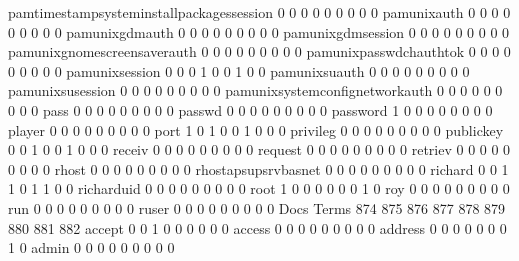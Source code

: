 \documentclass[compress,8pt]{beamer}
\begin{document}
\begin{frame}
\begin{Schunk}
  pamtimestampsysteminstallpackagessession   0   0   0   0   0   0   0   0   0
  pamunixauth                                0   0   0   0   0   0   0   0   0
  pamunixgdmauth                             0   0   0   0   0   0   0   0   0
  pamunixgdmsession                          0   0   0   0   0   0   0   0   0
  pamunixgnomescreensaverauth                0   0   0   0   0   0   0   0   0
  pamunixpasswdchauthtok                     0   0   0   0   0   0   0   0   0
  pamunixsession                             0   0   0   1   0   0   1   0   0
  pamunixsuauth                              0   0   0   0   0   0   0   0   0
  pamunixsusession                           0   0   0   0   0   0   0   0   0
  pamunixsystemconfignetworkauth             0   0   0   0   0   0   0   0   0
  pass                                       0   0   0   0   0   0   0   0   0
  passwd                                     0   0   0   0   0   0   0   0   0
  password                                   1   0   0   0   0   0   0   0   0
  player                                     0   0   0   0   0   0   0   0   0
  port                                       1   0   1   0   0   1   0   0   0
  privileg                                   0   0   0   0   0   0   0   0   0
  publickey                                  0   0   1   0   0   1   0   0   0
  receiv                                     0   0   0   0   0   0   0   0   0
  request                                    0   0   0   0   0   0   0   0   0
  retriev                                    0   0   0   0   0   0   0   0   0
  rhost                                      0   0   0   0   0   0   0   0   0
  rhostapsupsrvbasnet                        0   0   0   0   0   0   0   0   0
  richard                                    0   0   1   1   0   1   1   0   0
  richarduid                                 0   0   0   0   0   0   0   0   0
  root                                       1   0   0   0   0   0   0   1   0
  roy                                        0   0   0   0   0   0   0   0   0
  run                                        0   0   0   0   0   0   0   0   0
  ruser                                      0   0   0   0   0   0   0   0   0
                                          Docs
Terms                                      874 875 876 877 878 879 880 881 882
  accept                                     0   0   1   0   0   0   0   0   0
  access                                     0   0   0   0   0   0   0   0   0
  address                                    0   0   0   0   0   0   0   1   0
  admin                                      0   0   0   0   0   0   0   0   0

\end{Schunk}
\end{frame}
\end{document}
